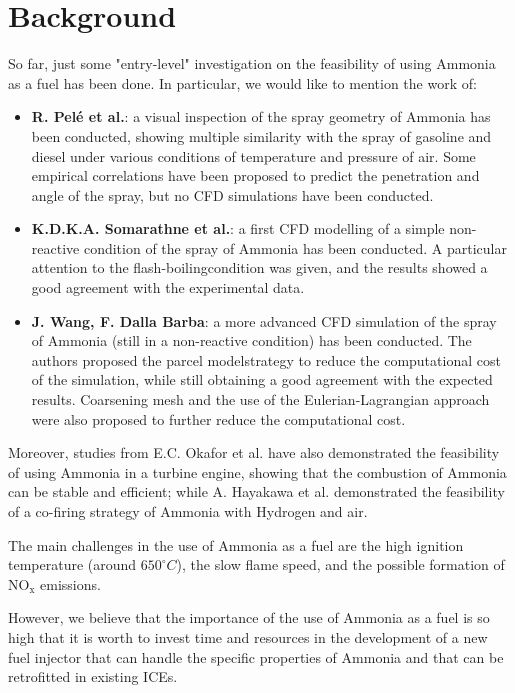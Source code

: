 \section{Background}
\label{sec:background}

So far, just some "entry-level" investigation on the feasibility of using Ammonia as a fuel has been done.
In particular, we would like to mention the work of:

\begin{itemize}
    \item \textbf{R. Pelé et al.\cite{pele}}: a visual inspection of the spray geometry of Ammonia has been conducted, showing multiple similarity with the spray of gasoline and diesel under various conditions of temperature and pressure of air. Some empirical correlations have been proposed to predict the penetration and angle of the spray, but no CFD simulations have been conducted.
    \item \textbf{K.D.K.A. Somarathne et al.\cite{somarathne}}: a first CFD modelling of a simple non-reactive condition of the spray of Ammonia has been conducted. A particular attention to the flash-boiling\footnotemark[1] condition was given, and the results showed a good agreement with the experimental data.
    \item \textbf{J. Wang, F. Dalla Barba\cite{wang-dalla-barba}}: a more advanced CFD simulation of the spray of Ammonia (still in a non-reactive condition) has been conducted. The authors proposed the parcel model\footnotemark[2] strategy to reduce the computational cost of the simulation, while still obtaining a good agreement with the expected results. Coarsening mesh and the use of the Eulerian-Lagrangian approach were also proposed to further reduce the computational cost.
\end{itemize}



Moreover, studies from E.C. Okafor et al.\cite{okafor} have also demonstrated the feasibility of using Ammonia in a turbine engine, showing that the combustion of Ammonia can be stable and efficient; while A. Hayakawa et al.\cite{hayakawa} demonstrated the feasibility of a co-firing strategy of Ammonia with Hydrogen and air.

The main challenges in the use of Ammonia as a fuel are the high ignition temperature (around $650^\circ C$), the slow flame speed, and the possible formation of $\mathrm{NO_x}$ emissions.

However, we believe that the importance of the use of Ammonia as a fuel is so high that it is worth to invest time and resources in the development of a new fuel injector that can handle the specific properties of Ammonia and that can be retrofitted in existing ICEs.
